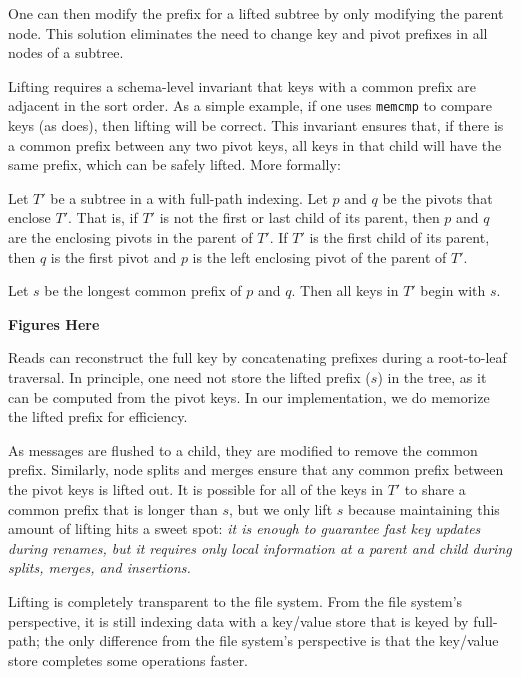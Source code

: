 One can then modify the prefix for a lifted subtree by only modifying the
parent node.
This solution
eliminates the need to change key and pivot prefixes in all nodes of a subtree.

Lifting requires a schema-level invariant that keys with a common prefix are adjacent
in the sort order.  As a simple example, if one uses {\tt memcmp} to compare keys (as \betrfs does),
then lifting will be correct.  This invariant ensures that, if there is a common prefix between any two pivot keys,
all keys in that child will have the same prefix, which can be safely lifted.
More formally:
\begin{invariant}
Let $T'$ be a subtree in a \bet with full-path indexing.  Let $p$ and
$q$ be the pivots that enclose $T'$.  That is, if $T'$ is not the first
or last child of its parent, then $p$ and $q$ are the enclosing pivots
in the parent of $T'$.  If $T'$ is the first child of its parent, then
$q$ is the first pivot and $p$ is the left enclosing pivot of the parent of $T'$.

Let $s$ be the longest common prefix of $p$ and $q$.  Then all keys
in $T'$ begin with $s$.
\end{invariant}

\textbf{Figures Here}

Reads can reconstruct the full key by concatenating prefixes during a
root-to-leaf traversal.  In principle, one need not store the lifted prefix ($s$)
in the tree, as it can be computed from the pivot keys.
In our implementation, we do memorize the lifted prefix for efficiency.

As messages are flushed to a child, they
are modified to remove the common prefix.
Similarly, node splits and merges ensure that
any common prefix between the pivot keys is lifted out.
It is possible for all of the keys in $T'$ to
share a common prefix that is longer than $s$,  but we only lift
$s$ because maintaining this amount of lifting hits a sweet spot: \textit{it
is enough to guarantee fast key updates during renames, but it
requires only local information at a parent and child  
during splits, merges, and insertions.}

Lifting  is completely transparent to the file system.
From the file system's perspective, it is still indexing data with a
key/value store that is keyed by full-path; the only difference from the file
system's perspective is that the key/value store completes some
operations faster.

